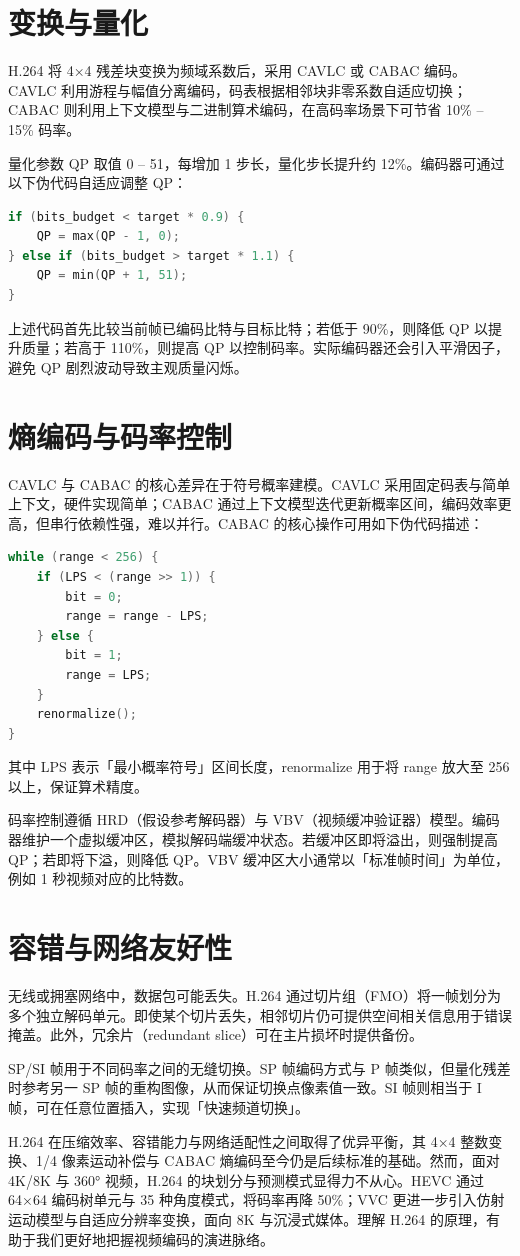 \chapter{变换与量化}
H.264 将 4×4 残差块变换为频域系数后，采用 CAVLC 或 CABAC 编码。CAVLC 利用游程与幅值分离编码，码表根据相邻块非零系数自适应切换；CABAC 则利用上下文模型与二进制算术编码，在高码率场景下可节省 10\%{} – 15\%{} 码率。\par
量化参数 QP 取值 0 – 51，每增加 1 步长，量化步长提升约 12\%{}。编码器可通过以下伪代码自适应调整 QP：\par
\begin{lstlisting}[language=c]
if (bits_budget < target * 0.9) {
    QP = max(QP - 1, 0);
} else if (bits_budget > target * 1.1) {
    QP = min(QP + 1, 51);
}
\end{lstlisting}
上述代码首先比较当前帧已编码比特与目标比特；若低于 90\%{}，则降低 QP 以提升质量；若高于 110\%{}，则提高 QP 以控制码率。实际编码器还会引入平滑因子，避免 QP 剧烈波动导致主观质量闪烁。\par
\chapter{熵编码与码率控制}
CAVLC 与 CABAC 的核心差异在于符号概率建模。CAVLC 采用固定码表与简单上下文，硬件实现简单；CABAC 通过上下文模型迭代更新概率区间，编码效率更高，但串行依赖性强，难以并行。CABAC 的核心操作可用如下伪代码描述：\par
\begin{lstlisting}[language=c]
while (range < 256) {
    if (LPS < (range >> 1)) {
        bit = 0;
        range = range - LPS;
    } else {
        bit = 1;
        range = LPS;
    }
    renormalize();
}
\end{lstlisting}
其中 LPS 表示「最小概率符号」区间长度，renormalize 用于将 range 放大至 256 以上，保证算术精度。\par
码率控制遵循 HRD（假设参考解码器）与 VBV（视频缓冲验证器）模型。编码器维护一个虚拟缓冲区，模拟解码端缓冲状态。若缓冲区即将溢出，则强制提高 QP；若即将下溢，则降低 QP。VBV 缓冲区大小通常以「标准帧时间」为单位，例如 1 秒视频对应的比特数。\par
\chapter{容错与网络友好性}
无线或拥塞网络中，数据包可能丢失。H.264 通过切片组（FMO）将一帧划分为多个独立解码单元。即使某个切片丢失，相邻切片仍可提供空间相关信息用于错误掩盖。此外，冗余片（redundant slice）可在主片损坏时提供备份。\par
SP/SI 帧用于不同码率之间的无缝切换。SP 帧编码方式与 P 帧类似，但量化残差时参考另一 SP 帧的重构图像，从而保证切换点像素值一致。SI 帧则相当于 I 帧，可在任意位置插入，实现「快速频道切换」。\par
H.264 在压缩效率、容错能力与网络适配性之间取得了优异平衡，其 4×4 整数变换、1/4 像素运动补偿与 CABAC 熵编码至今仍是后续标准的基础。然而，面对 4K/8K 与 360° 视频，H.264 的块划分与预测模式显得力不从心。HEVC 通过 64×64 编码树单元与 35 种角度模式，将码率再降 50\%{}；VVC 更进一步引入仿射运动模型与自适应分辨率变换，面向 8K 与沉浸式媒体。理解 H.264 的原理，有助于我们更好地把握视频编码的演进脉络。\par
